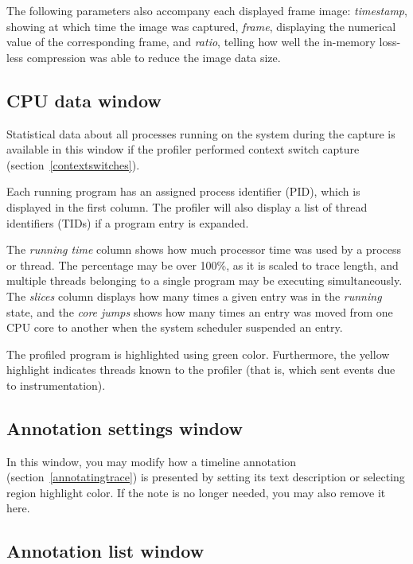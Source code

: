 \documentclass[hidelinks,titlepage,a4paper,twoside]{article}
\begin{document}
The following parameters also accompany each displayed frame image: \emph{timestamp}, showing at which time the image was captured, \emph{frame}, displaying the numerical value of the corresponding frame, and \emph{ratio}, telling how well the in-memory loss-less compression was able to reduce the image data size.

\subsection{CPU data window}
\label{cpudata}

Statistical data about all processes running on the system during the capture is available in this window if the profiler performed context switch capture (section~\ref{contextswitches}).

Each running program has an assigned process identifier (PID), which is displayed in the first column. The profiler will also display a list of thread identifiers (TIDs) if a program entry is expanded.

The \emph{running time} column shows how much processor time was used by a process or thread. The percentage may be over 100\%, as it is scaled to trace length, and multiple threads belonging to a single program may be executing simultaneously. The \emph{slices} column displays how many times a given entry was in the \emph{running} state, and the \emph{core jumps} shows how many times an entry was moved from one CPU core to another when the system scheduler suspended an entry.

The profiled program is highlighted using green color. Furthermore, the yellow highlight indicates threads known to the profiler (that is, which sent events due to instrumentation).

\subsection{Annotation settings window}
\label{annotationsettings}

In this window, you may modify how a timeline annotation (section~\ref{annotatingtrace}) is presented by setting its text description or selecting region highlight color. If the note is no longer needed, you may also remove it here.

\subsection{Annotation list window}
\label{annotationlist}
\end{document}
